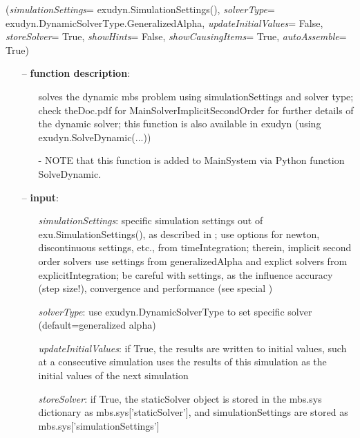 \ei

%
\begin{flushleft}
\label{sec:mainsystemextensions:SolveDynamic}
({\it simulationSettings}= exudyn.SimulationSettings(), {\it solverType}= exudyn.DynamicSolverType.GeneralizedAlpha, {\it updateInitialValues}= False, {\it storeSolver}= True, {\it showHints}= False, {\it showCausingItems}= True, {\it autoAssemble}= True)
\end{flushleft}
\setlength{\itemindent}{0.7cm}
\begin{itemize}[leftmargin=0.7cm]
\item[--]
{\bf function description}: \vspace{-6pt}
\begin{itemize}[leftmargin=1.2cm]
\setlength{\itemindent}{-0.7cm}
\item[]solves the dynamic mbs problem using simulationSettings and solver type; check theDoc.pdf for MainSolverImplicitSecondOrder for further details of the dynamic solver; this function is also available in exudyn (using exudyn.SolveDynamic(...))
\item[]- NOTE that this function is added to MainSystem via Python function SolveDynamic.
\end{itemize}
\item[--]
{\bf input}: \vspace{-6pt}
\begin{itemize}[leftmargin=1.2cm]
\setlength{\itemindent}{-0.7cm}
\item[]{\it simulationSettings}: specific simulation settings out of exu.SimulationSettings(), as described in ; use options for newton, discontinuous settings, etc., from timeIntegration; therein, implicit second order solvers use settings from generalizedAlpha and explict solvers from explicitIntegration; be careful with settings, as the influence accuracy (step size!), convergence and performance (see special )
\item[]{\it solverType}: use exudyn.DynamicSolverType to set specific solver (default=generalized alpha)
\item[]{\it updateInitialValues}: if True, the results are written to initial values, such at a consecutive simulation uses the results of this simulation as the initial values of the next simulation
\item[]{\it storeSolver}: if True, the staticSolver object is stored in the mbs.sys dictionary as mbs.sys['staticSolver'], and simulationSettings are stored as mbs.sys['simulationSettings']

\end{itemize}
\end{itemize}
